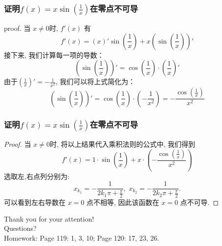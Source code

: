 \documentclass[
10pt,
aspectratio=43,
]{beamer}
\begin{document}
\begin{frame}
	\frametitle{证明$f(x)=x\sin\left(\frac{1}{x}\right)$在零点不可导}

	\begin{block}{proof.}
		当 $x\neq0$时, $f'(x)$ 有
		\[
			f'(x) = \left(x\right)' \sin\left(\frac{1}{x}\right) + x \left(\sin\left(\frac{1}{x}\right)\right)'
		\]
		接下来, 我们计算每一项的导数：
		\[
			\left(\sin\left(\frac{1}{x}\right)\right)' = \cos\left(\frac{1}{x}\right) \cdot \left(\frac{1}{x}\right)'
		\]
		由于$\left(\frac{1}{x}\right)' = -\frac{1}{x^2}$, 我们可以将上式简化为：
		\[
			\left(\sin\left(\frac{1}{x}\right)\right)' = \cos\left(\frac{1}{x}\right) \cdot \left(-\frac{1}{x^2}\right) = -\frac{\cos\left(\frac{1}{x}\right)}{x^2}
		\]
	\end{block}
\end{frame}

\begin{frame}
	\frametitle{证明$f(x)=x\sin\left(\frac{1}{x}\right)$在零点不可导}

	\begin{proof}
		当 $x\neq0$时, 将以上结果代入乘积法则的公式中, 我们得到
		\[
			f'(x) = 1 \cdot \sin\left(\frac{1}{x}\right) + x \cdot \left(-\frac{\cos\left(\frac{1}{x}\right)}{x^2}\right)
		\]
		选取左,右点列分别为:
		\[
			x_{k_1}=-\displaystyle\frac{1}{2k_1\pi+\frac{\pi}{2}},\,\,x_{k_2}=-\displaystyle\frac{1}{2k_2\pi+\frac{\pi}{2}}.
		\]
		可以看到左右导数在 $x=0$ 点不相等, 因此该函数在 $x=0$ 点不可导.
	\end{proof}
\end{frame}




\begin{frame}[plain]
	\vfill
	\centering
	{
		\centering \Huge \color{white} Thank you for your attention!\\[10pt]Questions?\\\bigskip
		Homework: Page 119: 1, 3, 10; Page 120: 17, 23, 26.
	}
	\vfill
\end{frame}
\end{document}
